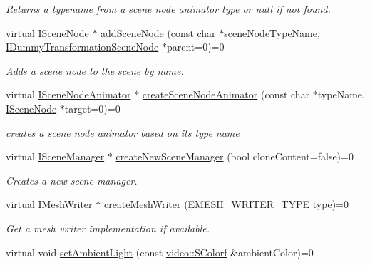 \begin{DoxyCompactItemize}
\begin{DoxyCompactList}\small\item\em Returns a typename from a scene node animator type or null if not found. \end{DoxyCompactList}\item 
virtual \hyperlink{classirr_1_1scene_1_1ISceneNode}{I\+Scene\+Node} $\ast$ \hyperlink{classirr_1_1scene_1_1ISceneManager_a8a3616e641e586b400a923b967ff32ab}{add\+Scene\+Node} (const char $\ast$scene\+Node\+Type\+Name, \hyperlink{classirr_1_1scene_1_1IDummyTransformationSceneNode}{I\+Dummy\+Transformation\+Scene\+Node} $\ast$parent=0)=0
\begin{DoxyCompactList}\small\item\em Adds a scene node to the scene by name. \end{DoxyCompactList}\item 
virtual \hyperlink{classirr_1_1scene_1_1ISceneNodeAnimator}{I\+Scene\+Node\+Animator} $\ast$ \hyperlink{classirr_1_1scene_1_1ISceneManager_ac63c38a05b8e7d0a11ddb1752da36835}{create\+Scene\+Node\+Animator} (const char $\ast$type\+Name, \hyperlink{classirr_1_1scene_1_1ISceneNode}{I\+Scene\+Node} $\ast$target=0)=0
\begin{DoxyCompactList}\small\item\em creates a scene node animator based on its type name \end{DoxyCompactList}\item 
virtual \hyperlink{classirr_1_1scene_1_1ISceneManager}{I\+Scene\+Manager} $\ast$ \hyperlink{classirr_1_1scene_1_1ISceneManager_a94805dd4eca41ccef9607aefe669aed9}{create\+New\+Scene\+Manager} (bool clone\+Content=false)=0
\begin{DoxyCompactList}\small\item\em Creates a new scene manager. \end{DoxyCompactList}\item 
virtual \hyperlink{classirr_1_1scene_1_1IMeshWriter}{I\+Mesh\+Writer} $\ast$ \hyperlink{classirr_1_1scene_1_1ISceneManager_ae9a06fb68757381f99cfe11ecbd153e6}{create\+Mesh\+Writer} (\hyperlink{namespaceirr_1_1scene_a431fa15741518ba15f6d5f2608b6cb4e}{E\+M\+E\+S\+H\+\_\+\+W\+R\+I\+T\+E\+R\+\_\+\+T\+Y\+PE} type)=0
\begin{DoxyCompactList}\small\item\em Get a mesh writer implementation if available. \end{DoxyCompactList}\item 
virtual void \hyperlink{classirr_1_1scene_1_1ISceneManager_a8a424accb615c4f60fde59f55033a816}{set\+Ambient\+Light} (const \hyperlink{classirr_1_1video_1_1SColorf}{video\+::\+S\+Colorf} \&ambient\+Color)=0\hypertarget{classirr_1_1scene_1_1ISceneManager_a8a424accb615c4f60fde59f55033a816}{}\label{classirr_1_1scene_1_1ISceneManager_a8a424accb615c4f60fde59f55033a816}


\end{DoxyCompactItemize}
